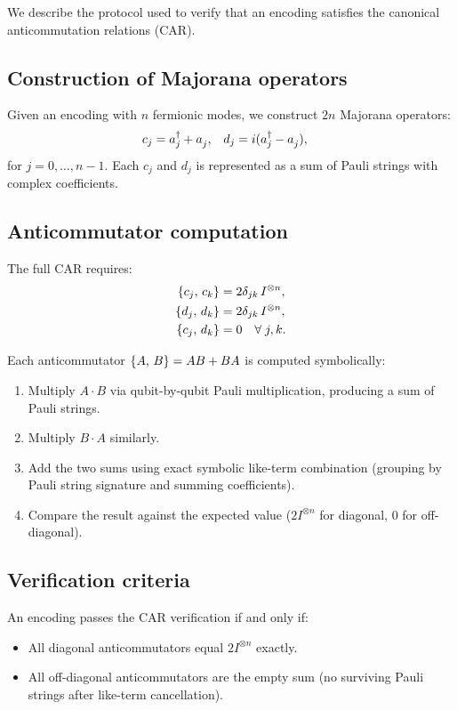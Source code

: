 
We describe the protocol used to verify that an encoding satisfies
the canonical anticommutation relations (CAR).

\subsection*{Construction of Majorana operators}

Given an encoding with $n$ fermionic modes, we construct $2n$
Majorana operators:
\begin{align}
  c_j &= \ad{j} + \an{j}, &
  d_j &= i(\ad{j} - \an{j}),
\end{align}
for $j = 0, \ldots, n-1$.  Each $c_j$ and $d_j$ is represented as a
sum of Pauli strings with complex coefficients.

\subsection*{Anticommutator computation}

The full CAR requires:
\begin{align}
  \{c_j,\,c_k\} &= 2\delta_{jk}\, I^{\otimes n}, \\
  \{d_j,\,d_k\} &= 2\delta_{jk}\, I^{\otimes n}, \\
  \{c_j,\,d_k\} &= 0 \quad \forall\; j, k.
\end{align}

Each anticommutator $\{A,\,B\} = AB + BA$ is computed symbolically:
\begin{enumerate}
  \item Multiply $A \cdot B$ via qubit-by-qubit Pauli multiplication,
    producing a sum of Pauli strings.
  \item Multiply $B \cdot A$ similarly.
  \item Add the two sums using exact symbolic like-term combination
    (grouping by Pauli string signature and summing coefficients).
  \item Compare the result against the expected value ($2I^{\otimes n}$
    for diagonal, $0$ for off-diagonal).
\end{enumerate}

\subsection*{Verification criteria}

An encoding passes the CAR verification if and only if:
\begin{itemize}
  \item All diagonal anticommutators equal $2I^{\otimes n}$ exactly.
  \item All off-diagonal anticommutators are the empty sum (no
    surviving Pauli strings after like-term cancellation).
\end{itemize}

